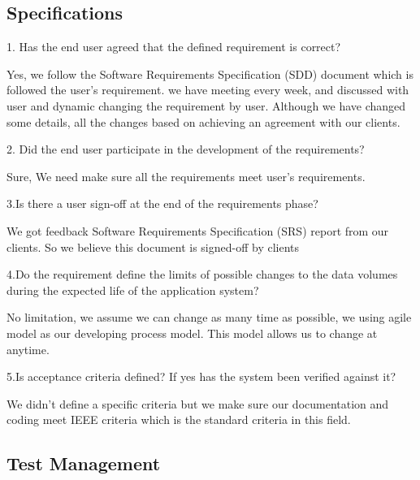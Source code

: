 \documentclass[12pt]{article}
\begin{document}
\subsection {Specifications}
\begin{description}
\item{1. Has the end user agreed that the defined requirement is correct?}
\item{Yes, we follow the Software Requirements Specification (SDD) document which is  followed the user's requirement. we have meeting every week, and discussed with user and dynamic changing the requirement by user. Although we have changed some details, all the changes based on achieving an agreement with our clients.}

\item{2. Did the end user participate in the development of the requirements?}
\item{Sure, We need make sure all the requirements meet user's requirements.}

\item{3.Is there a user sign-off at the end of the requirements phase?}
\item{We got feedback Software Requirements Specification (SRS) report from our clients. So we believe this document is signed-off by clients}

\item{4.Do the requirement define the limits of possible changes to the data volumes during the expected life of the application system?}
\item{No limitation, we assume we can change as many time as possible, we using agile model as our developing process model. This model allows us to change at anytime.}

\item{5.Is acceptance criteria defined? If yes has the system been verified against it?}
\item{We didn't define a specific criteria but we make sure our documentation and coding meet IEEE criteria which is the standard criteria in this field.}


\end {description}

\subsection {Test Management}
\end{document}
